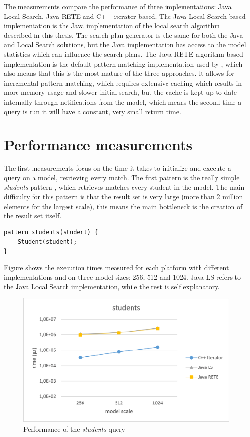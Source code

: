 The measurements compare the performance of three implementations: Java Local
Search, Java RETE\cite{EIQ-Rete} and C++ iterator based. The Java Local Search
based implementation is the Java implementation of the local search algorithm
described in this thesis. The search plan generator is the same for both
the Java and \CPP{} Local Search solutions, but the Java implementation has
access to the model statistics which can influence the search plans. The Java
RETE algorithm based implementation is the default pattern matching
implementation used by \EIQ{}, which also means that this is the most mature of
the three approaches. It allows for incremental pattern matching, which
requires extensive caching which results in more memory usage and slower
initial search, but the cache is kept up to date internally through
notifications from the model, which means the second time a query is run it
will have a constant, very small return time.

\section{Performance measurements}

The first measurements focus on the time it takes to initialize and execute a
query on a model, retrieving every match. The first pattern is the really simple
\emph{students} pattern , which retrieves matches every
student in the model. The main difficulty for this pattern is that the result
set is very large (more than 2 million elements for the largest scale), this
means the main bottleneck is the creation of the result set itself.

\begin{lstlisting}[frame=single,float=!ht,language=IQPL,
label=listing:meas_students, caption=The students pattern]
pattern students(student) {
	Student(student);
}
\end{lstlisting}

Figure  shows the execution times measured for each platform
with different implementations and on three model sizes: 256, 512 and 1024. Java
LS refers to the Java Local Search implementation, while the rest is self
explanatory.

\begin{figure}[!ht]
\centering
\includegraphics[width=120mm, keepaspectratio]{figures/meas_students.png}
\caption{Performance of the \emph{students} query}
\label{fig:meas_students}
\end{figure}

